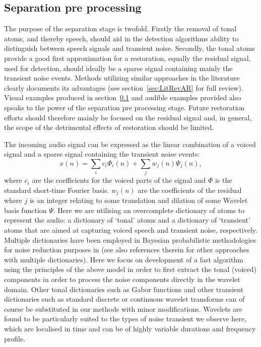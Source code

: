 \subsection{Separation pre processing}\label{sec:WPseparation}
The purpose of the separation stage is twofold. Firstly the removal of tonal atoms, and thereby speech, should aid in the detection algorithms ability to distinguish between speech signals and transient noise. Secondly, the tonal atoms provide a good first approximation for a restoration, equally the residual signal, used for detection, should ideally be a sparse signal containing mainly the transient noise events. Methods utilizing similar approaches in the literature clearly documents its advantages\cite{Godsill1998book} (see section~\ref{sec:LitRevAR} for full review). Visual examples produced in section~\ref{sec:WPseparation} and audible examples provided  also speaks to the power of the separation pre processing stage.
Future restoration efforts should therefore mainly be focused on the residual signal and, in general, the scope of the detrimental effects of restoration should be limited.

The incoming audio signal can be expressed as the linear combination of a voiced signal and a sparse signal containing the transient noise events:
\begin{equation}\label{eq:modelgeneral}
    x(n) = \sum_i c_i \Phi_i(n) + \sum_{j} w_{j}(n) \Psi_{j}(n),
\end{equation}
where $c_i$ are the coefficients for the voiced parts of the signal and $\Phi$ is the standard short-time Fourier basis. $w_{j}(n)$ are the coefficients of the residual where $j$ is an integer relating to some translation and dilation of some Wavelet basis function $\Psi$. Here we are utilising an overcomplete dictionary of atoms to represent the audio: a dictionary of `tonal' atoms and a dictionary of `transient' atoms that are aimed at capturing voiced speech and transient noise, respectively. Multiple dictionaries have been employed in Bayesian probabilistic methodologies for noise reduction purposes in \cite{Fevotte2006}\cite{Fevotte2008} (see also references therein for other approaches with multiple dictionaries). Here we focus on development of a fast algorithm using the principles of the above model in order to first extract the tonal (voiced) components in order to process the noise components directly in the wavelet domain. Other tonal dictionaries such as Gabor functions and other transient dictionaries such as standard discrete or continuous wavelet transforms can of course be substituted in our methods with minor modifications. Wavelets are found to be particularly suited to the types of noise transient we observe here, which are localised in time and can be of highly variable durations and frequency profile.

